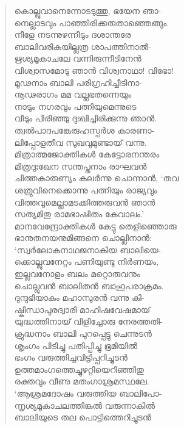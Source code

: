 \begin{verse}
കൊല്ലുവാനെന്നോടടുത്തു, ഭയേന ഞാ-\\
നെല്ലാടവും പാഞ്ഞിരിക്കരുതാഞ്ഞെങ്ങും.\\
നീളേ നടന്നുഴന്നീടും ദശാന്തരേ\\
ബാലിവരികയില്ലത്ര ശാപത്തിനാല്‍-\\
ഋശ്യമൂകാചലേ വന്നിരുന്നീടിനേന്‍\\
വിശ്വാസമോടു ഞാന്‍ വിശ്വനാഥാ! വിഭോ!\\
മൂഢനാം ബാലി പരിഗ്രഹിച്ചീടിനാ-\\
നൂഢരാഗം മമ വല്ലഭതന്നെയും\\
നാടും നഗരവും പത്നിയുമെന്നുടെ\\
വീടും പിരിഞ്ഞു ദുഃഖിച്ചിരിക്കുന്നു ഞാന്‍.\\
ത്വല്‍പാദപങ്കേരുഹസ്പര്‍ശ കാരണാ-\\
ലിപ്പോളതീവ സുഖവുമുണ്ടായ് വന്നു.\\
മിത്രാത്മജോക്തികള്‍ കേട്ടോരനന്തരം\\
മിത്രദുഃഖേന സന്തപ്തനാം രാഘവന്‍\\
ചിത്തകാരുണ്യം കലര്‍ന്നു ചൊന്നാന്‍, ‘തവ\\
ശത്രുവിനെക്കൊന്നു പത്നിയും രാജ്യവും\\
വിത്തവുമെല്ലാമടക്കിത്തരുവന്‍ ഞാന്‍\\
സത്യമിതു രാമഭാഷിതം കേവാലം.’\\
മാനവേന്ദ്രോക്തികള്‍ കേട്ടു തെളിഞ്ഞൊരു\\
ഭാനുതനയനുമിങ്ങനെ ചൊല്ലിനാന്‍:\\
‘സ്വര്‍ലോകനാഥജനാകിയ ബാലിയെ-\\
ക്കൊല്ലുവനേറ്റം പണിയുണ്ടു നിര്‍ണയം,\\
ഇല്ലവനോളം ബലം മറ്റൊരുവനും\\
ചൊല്ലുവന്‍ ബാലിതന്‍ ബാഹുപരാക്രമം.\\
ദുന്ദുഭിയാകും മഹാസുരന്‍ വന്നു കി-\\
ഷ്കിന്ധാപുരദ്വാരി മാഹിഷവേഷമായ്\\
യുദ്ധത്തിനായ് വിളിച്ചോരു നേരത്തതി-\\
ക്രുദ്ധനാം ബാലി പുറപ്പെട്ടു ചെന്നുടന്‍\\
ശൃംഗം പിടിച്ചു പതിപ്പിച്ചു ഭൂമിയില്‍\\
ഭംഗം വരുത്തിച്ചവിട്ടിപ്പറിച്ചുടന്‍\\
ഉത്തമാംഗത്തെച്ചുഴറ്റിയെറിഞ്ഞിതു\\
രക്തവും വീണു മതംഗാശ്രമസ്ഥലേ.\\
‘ആശ്രമദോഷം വരുത്തിയ ബാലിപോ-\\
ന്നൃശ്യമൂകാചലത്തിങ്കല്‍ വരുന്നാകില്‍\\
ബാലിയുടെ തല പൊട്ടിത്തെറിച്ചുടന്‍\\

\end{verse}
